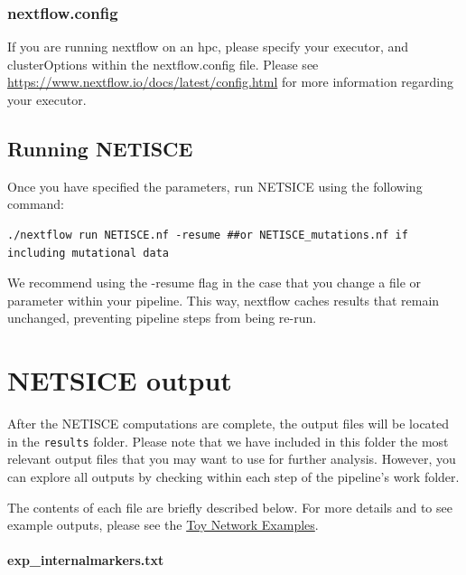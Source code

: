 \documentclass[
]{book}
\begin{document}
\hypertarget{nextflow.config}{%
\subsection{nextflow.config}\label{nextflow.config}}

If you are running nextflow on an hpc, please specify your executor, and clusterOptions within the nextflow.config file. Please see \url{https://www.nextflow.io/docs/latest/config.html} for more information regarding your executor.

\hypertarget{running-netisce}{%
\section{Running NETISCE}\label{running-netisce}}

Once you have specified the parameters, run NETSICE using the following command:

\begin{verbatim}
./nextflow run NETISCE.nf -resume ##or NETISCE_mutations.nf if including mutational data
\end{verbatim}

We recommend using the -resume flag in the case that you change a file or parameter within your pipeline. This way, nextflow caches results that remain unchanged, preventing pipeline steps from being re-run.

\hypertarget{netsice-output}{%
\chapter{NETSICE output}\label{netsice-output}}

After the NETISCE computations are complete, the output files will be located in the \texttt{results} folder. Please note that we have included in this folder the most relevant output files that you may want to use for further analysis. However, you can explore all outputs by checking within each step of the pipeline's work folder.

The contents of each file are briefly described below. For more details and to see example outputs, please see the \protect\hyperlink{toy}{Toy Network Examples}.

\hypertarget{section-id}{%
\subsubsection*{exp\_internalmarkers.txt}\label{section-id}}
\end{document}
